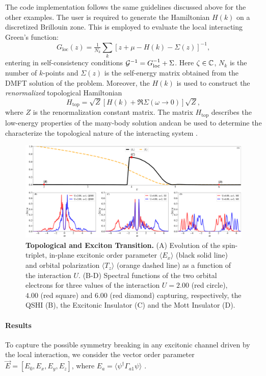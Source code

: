 \documentclass[edipack_sp.tex]{subfiles}
\begin{document}
The code implementation follows the same guidelines discussed above for the other examples. The user is required to generate the Hamiltonian $H(k)$ on a discretized Brillouin zone. 
This is employed to evaluate the local interacting Green's function:
$$
G_\mathrm{loc}(z) = \tfrac{1}{N_k}\sum_k \left[z+\mu-H(k)-\Sigma(z)
\right]^{-1}, 
$$
entering in self-consistency conditions ${\cal G}^{-1}=G_\mathrm{loc}^{-1}+\Sigma$. 
Here  $\zeta\in\mathbb{C}$, $N_k$ is the number of $k$-points   and $\Sigma(z)$ is the self-energy matrix  obtained from the DMFT solution of the problem.  
Moreover, the $H(k)$ is used to  construct the {\it renormalized} topological Hamiltonian \cite{Wang2010PRL,Wang2012PRX,Blason2023PRB}
$$
H_\mathrm{top} = \sqrt{Z}[H(k) + \Re\Sigma(\omega\to0)]\sqrt{Z}, 
$$
where $Z$ is the renormalization constant matrix. The matrix $H_\mathrm{top}$ describes the
low-energy properties of the many-body solution andcan be used to determine the characterize the topological nature of the interacting system  \cite{Gurarie2011PRB,Wang2012PRX,Wagner2023NC,Blason2023PRB,Bau2024PRB}.  




\begin{figure}[t!]
  \includegraphics[width=\linewidth]{figures/figBHZ.pdf}
    \caption{\label{figEx4}%
      \textbf{Topological and Exciton Transition.}
      (A) Evolution of the spin-triplet,
      in-plane excitonic order parameter $\langle E_x\rangle$ (black solid line) and
      orbital polarization $\langle T_z\rangle$ (orange dashed line) as a function of the
      interaction $U$.
      (B-D) Spectral functions of the two orbital electrons for three
      values of the interaction $U=2.00$ (red circle), $4.00$ (red
      square) and $6.00$ (red diamond) capturing, respectively, the
      QSHI (B), the Excitonic Insulator (C) and the Mott Insulator
      (D). 
    }
\end{figure}

\paragraph{Results}
To capture the possible symmetry breaking in any excitonic channel
driven by the local interaction, we consider the vector order
parameter
$\vec{E}=[E_0,E_x,E_y,E_z]$, where $E_a=\langle\psi^\dagger
\Gamma_{a1}\psi \rangle$ \cite{Budich2014,Kunes2014PRB,Kaneko2015JOPCS,Kunes2015JOPCM,Knolle2017PRL,Guerci2019PRM,Geffroy2019PRL,Mazza2020PRL,De-Palo2023PRB}.
\end{document}
